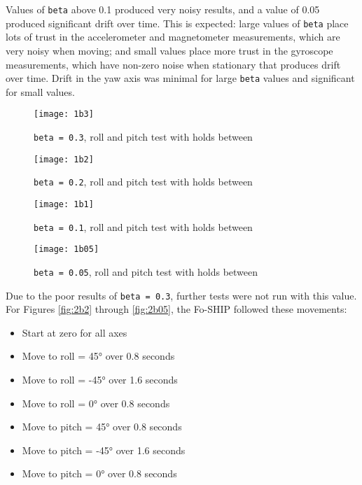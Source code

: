 \documentclass[11pt]{ucthesisCP}
\begin{document}
Values of \verb|beta| above 0.1 produced very noisy results, and a value of 0.05 produced significant drift over time. This is expected: large values of \verb|beta| place lots of trust in the accelerometer and magnetometer measurements, which are very noisy when moving; and small values place more trust in the gyroscope measurements, which have non-zero noise when stationary that produces drift over time. Drift in the yaw axis was minimal for large \verb|beta| values and significant for small values.

\begin{figure}[htbp]
\centering
\texttt{[image: 1b3]}
\caption{\texttt{beta = 0.3}, roll and pitch test with holds between}
\label{fig:1b3}
\end{figure}

\begin{figure}[htbp]
\centering
\texttt{[image: 1b2]}
\caption{\texttt{beta = 0.2}, roll and pitch test with holds between}
\label{fig:1b2}
\end{figure}

\begin{figure}[htbp]
\centering
\texttt{[image: 1b1]}
\caption{\texttt{beta = 0.1}, roll and pitch test with holds between}
\label{fig:1b1}
\end{figure}

\begin{figure}[htbp]
\centering
\texttt{[image: 1b05]}
\caption{\texttt{beta = 0.05}, roll and pitch test with holds between}
\label{fig:1b05}
\end{figure}

Due to the poor results of \verb|beta = 0.3|, further tests were not run with this value. For Figures \ref{fig:2b2} through \ref{fig:2b05}, the Fo-SHIP followed these movements:
\begin{itemize}[noitemsep,topsep=0pt,]
\item Start at zero for all axes
\item Move to roll = 45° over 0.8 seconds
\item Move to roll = -45° over 1.6 seconds
\item Move to roll = 0° over 0.8 seconds
\item Move to pitch = 45° over 0.8 seconds
\item Move to pitch = -45° over 1.6 seconds
\item Move to pitch = 0° over 0.8 seconds
\end{itemize}
\end{document}

